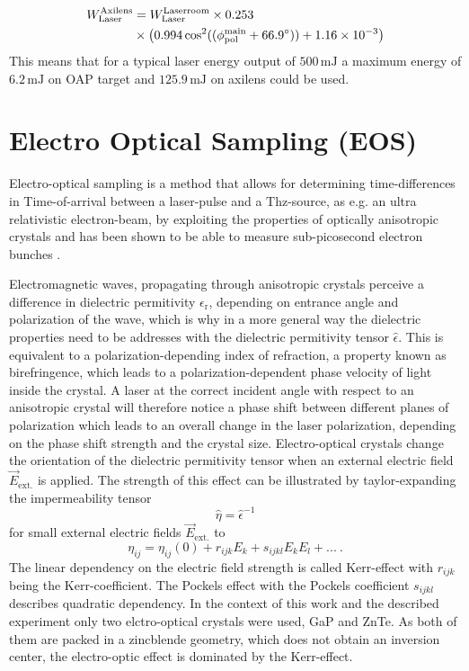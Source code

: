 \begin{align}
 W_\mathrm{Laser}^\mathrm{Axilens} &= W_\mathrm{Laser}^\mathrm{Laserroom}\times 0.253\\
  &\times\big( 0.994 \cos^2((\phi_\mathrm{pol}^\mathrm{main}+66.9\degree)) +1.16\times 10^{-3}\big)\\
\end{align}
This means that for a typical laser energy output of $500\, \mathrm{mJ}$ a maximum energy of $6.2\, \mathrm{mJ}$ on OAP target and $125.9\,\mathrm{mJ}$ on axilens could be used.


\section{Electro Optical Sampling (EOS)}
\label{sec:EOS}
Electro-optical sampling is a method that allows for determining time-differences in Time-of-arrival between a laser-pulse and a Thz-source, as e.g. an ultra relativistic electron-beam, by exploiting the properties of optically anisotropic crystals and has been shown to be able to measure sub-picosecond electron bunches \cite{YanX_EOS_PRL2000}.

Electromagnetic waves, propagating through anisotropic crystals perceive a difference in dielectric permitivity $\epsilon_\mathrm{r}$, depending on entrance angle and polarization of the wave, which is why in a more general way the dielectric properties need to be addresses with the dielectric permitivity tensor  $\hat{\epsilon}$.
This is equivalent to a polarization-depending index of refraction, a property known as birefringence, which leads to a polarization-dependent phase velocity of light inside the crystal. 
A laser at the correct incident angle with respect to an anisotropic crystal will therefore notice a phase shift between different planes of polarization which leads to an overall change in the laser polarization, depending on the phase shift strength and the crystal size. 
Electro-optical crystals change the orientation of the dielectric permitivity tensor when an external electric field $\vec{E}_\mathrm{ext.}$ is applied.
The strength of this effect can be illustrated by taylor-expanding the impermeability tensor 
\begin{equation}
\hat{\eta}=\hat{\epsilon}^{-1}
\end{equation}
for small external electric fields $\vec{E}_\mathrm{ext.}$ to
\begin{equation}
\eta_{ij}=\eta_{ij}(0)+r_{ijk}E_k+s_{ijkl}E_k E_l+...\ .
\end{equation}
The linear dependency on the electric field strength is called Kerr-effect with $r_{ijk}$ being the Kerr-coefficient. 
The Pockels effect with the Pockels coefficient $s_{ijkl}$ describes quadratic dependency.
In the context of this work and the described experiment only two elctro-optical crystals were used, GaP and ZnTe. 
As both of them are packed in a zincblende geometry, which does not obtain an inversion center, the electro-optic effect is dominated by the Kerr-effect.

